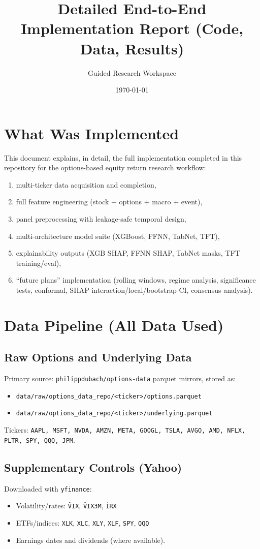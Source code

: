 \documentclass[11pt]{article}
\title{Detailed End-to-End Implementation Report (Code, Data, Results)}
\author{Guided Research Workspace}
\date{\today}
\begin{document}
\maketitle

\section{What Was Implemented}
This document explains, in detail, the full implementation completed in this repository for the options-based equity return research workflow:
\begin{enumerate}[leftmargin=1.2em]
  \item multi-ticker data acquisition and completion,
  \item full feature engineering (stock + options + macro + event),
  \item panel preprocessing with leakage-safe temporal design,
  \item multi-architecture model suite (XGBoost, FFNN, TabNet, TFT),
  \item explainability outputs (XGB SHAP, FFNN SHAP, TabNet masks, TFT training/eval),
  \item ``future plans'' implementation (rolling windows, regime analysis, significance tests, conformal, SHAP interaction/local/bootstrap CI, consensus analysis).
\end{enumerate}

\section{Data Pipeline (All Data Used)}

\subsection{Raw Options and Underlying Data}
Primary source: \texttt{philippdubach/options-data} parquet mirrors, stored as:
\begin{itemize}[leftmargin=1.2em]
  \item \texttt{data/raw/options\_data\_repo/<ticker>/options.parquet}
  \item \texttt{data/raw/options\_data\_repo/<ticker>/underlying.parquet}
\end{itemize}
Tickers: \texttt{AAPL, MSFT, NVDA, AMZN, META, GOOGL, TSLA, AVGO, AMD, NFLX, PLTR, SPY, QQQ, JPM}.

\subsection{Supplementary Controls (Yahoo)}
Downloaded with \texttt{yfinance}:
\begin{itemize}[leftmargin=1.2em]
  \item Volatility/rates: \texttt{\^VIX}, \texttt{\^VIX3M}, \texttt{\^IRX}
  \item ETFs/indices: \texttt{XLK}, \texttt{XLC}, \texttt{XLY}, \texttt{XLF}, \texttt{SPY}, \texttt{QQQ}
  \item Earnings dates and dividends (where available).
\end{itemize}
\end{document}
